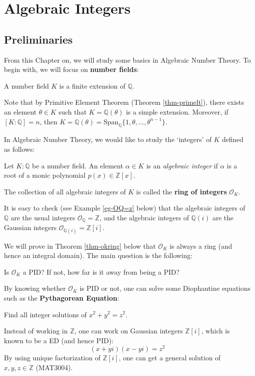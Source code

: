 \chapter{Algebraic Integers}
\section{Preliminaries}
From this Chapter on, we will study some basics in Algebraic Number Theory. To begin with, we will focus on {\bf number fields}:
\begin{definition}
A number field $K$ is a finite extension of $\mathbb{Q}$.
\end{definition}
Note that by Primitive Element Theorem (Theorem \ref{thm-primelt}), there exists an element $\theta \in K$ such that $K = \mathbb{Q}(\theta)$ is a simple extension. Moreover, 
if $[K : \mathbb{Q}] = n$, then
    $K = \mathbb{Q}(\theta) = \mathrm{Span}_{\mathbb{Q}}\{1, \theta, \ldots, \theta^{n-1}\}$.

In Algebraic Number Theory, we would like to study the `integers' of $K$ defined as follows: 
\begin{definition}
    Let $K:\mathbb{Q}$ be a number field. An element $\alpha \in K$ is an {\it algebraic integer} if $\alpha$ is a root of a monic polynomial $p(x) \in \mathbb{Z}[x]$.

    The collection of all algebraic integers of $K$ is called the {\bf ring of integers} $\mathcal{O}_K$.
\end{definition}
It is easy to check (see Example \ref{eg-OQ=z} below) that the algebraic integers of $\mathbb{Q}$ are the usual integers $\mathcal{O}_{\mathbb{Q}} = \mathbb{Z}$, and the algebraic integers of $\mathbb{Q}(i)$ are the Gaussian integers $\mathcal{O}_{\mathbb{Q}(i)} = \mathbb{Z}[i]$. 

We will prove in Theorem \ref{thm-okring} below that $\mathcal{O}_K$ is always a ring (and hence an integral domain). The main question is the following:
\begin{center}
    Is $\mathcal{O}_K$ a PID? If not, how far is it away from being a PID?
\end{center}

By knowing whether $\mathcal{O}_K$ is PID or not, one can solve some Diophantine equations such as the {\bf Pythagorean Equation}: 
\begin{center}
Find all integer solutions of $x^2 + y^2 = z^2$.     
\end{center}
Instead of working in $\mathbb{Z}$, one can work on Gaussian integers $\mathbb{Z}[i]$, which is known to be a ED (and hence PID):
    \begin{equation*}
         (x + yi)(x - yi) = z^2
    \end{equation*}
By using unique factorization of $\mathbb{Z}[i]$, one can get a general solution of $x,y,z \in \mathbb{Z}$ (MAT3004). 

